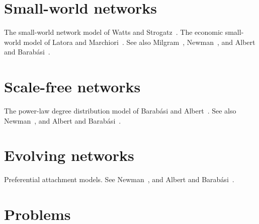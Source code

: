 




\section{Small-world networks}

The small-world network model of Watts and
Strogatz~\cite{WattsStrogatz1998}. The economic small-world model of
Latora and Marchiori~\cite{LatoraMarchiori2003}. See also
Milgram~\cite{Milgram1967}, Newman~\cite{Newman2003}, and Albert and
Barab{\'a}si~\cite{AlbertBarabasi2002}.



\section{Scale-free networks}

The power-law degree distribution model of Barab{\'a}si and
Albert~\cite{BarabasiAlbert1999}. See also Newman~\cite{Newman2003},
and Albert and Barab{\'a}si~\cite{AlbertBarabasi2002}.



\section{Evolving networks}

Preferential attachment models. See Newman~\cite{Newman2003},
and Albert and Barab{\'a}si~\cite{AlbertBarabasi2002}.



\section{Problems}


